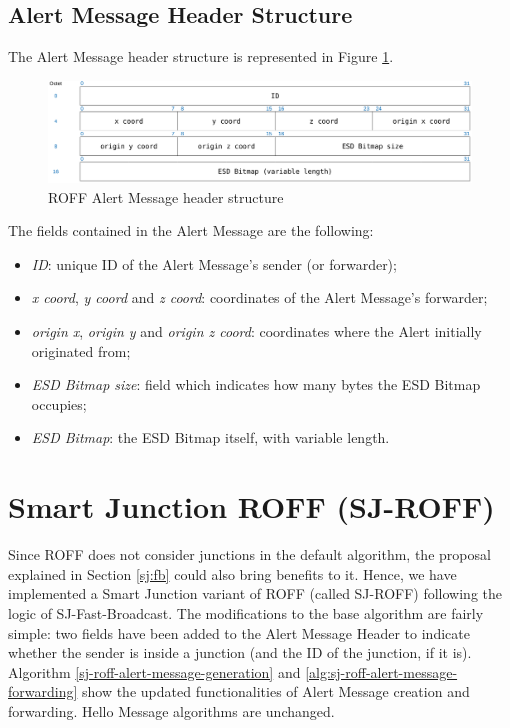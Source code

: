 		\subsection{Alert Message Header Structure}
			The Alert Message header structure is represented in Figure \ref{fig:roffAlertHeader}.
			
			\begin{figure}[H]
				\centering
				\includegraphics[width=\textwidth]{immagini/roffAlertHeader}
				\caption{ROFF Alert Message header structure}
				\label{fig:roffAlertHeader}
			\end{figure}
			
			The fields contained in the Alert Message are the following:
			\begin{itemize}
				\item \textit{ID}: unique ID of the Alert Message's sender (or forwarder);
				\item \textit{x coord}, \textit{y coord} and \textit{z coord}: coordinates of the Alert Message's forwarder;
				\item \textit{origin x}, \textit{origin y} and \textit{origin z coord}: coordinates where the Alert initially originated from;
				\item \textit{ESD Bitmap size}: field which indicates how many bytes the ESD Bitmap occupies;
				\item \textit{ESD Bitmap}: the ESD Bitmap itself, with variable length.
			\end{itemize}
	
	\section{Smart Junction ROFF (SJ-ROFF)}
		Since ROFF does not consider junctions in the default algorithm, the proposal explained in Section \ref{sj:fb} could also bring benefits to it. Hence, we have implemented a Smart Junction variant of ROFF (called SJ-ROFF) following the logic of SJ-Fast-Broadcast. The modifications to the base algorithm are fairly simple: two fields have been added to the Alert Message Header to indicate whether the sender is inside a junction (and the ID of the junction, if it is). Algorithm \ref{sj-roff-alert-message-generation} and \ref{alg:sj-roff-alert-message-forwarding} show the updated functionalities of Alert Message creation and forwarding. Hello Message algorithms are unchanged.
		
